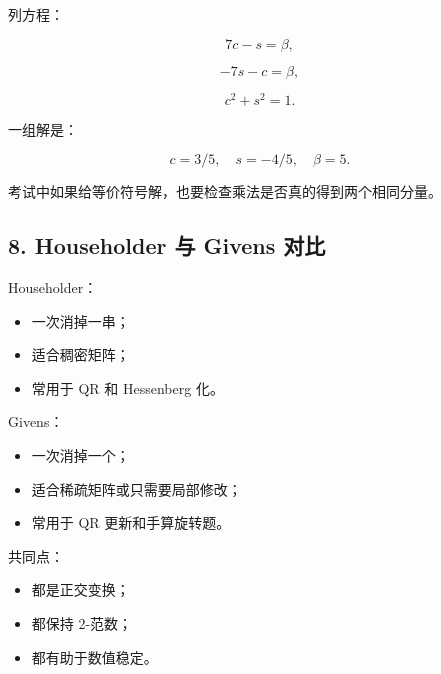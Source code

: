 \documentclass[11pt,a4paper]{ctexart}
\begin{document}
列方程：

\[
7c-s=\beta,
\]

\[
-7s-c=\beta,
\]

\[
c^2+s^2=1.
\]

一组解是：

\[
c=3/5,\quad s=-4/5,\quad \beta=5.
\]

考试中如果给等价符号解，也要检查乘法是否真的得到两个相同分量。


\subsection*{8. Householder 与 Givens 对比}


Householder：

\begin{itemize}

\item 一次消掉一串；

\item 适合稠密矩阵；

\item 常用于 QR 和 Hessenberg 化。

\end{itemize}

Givens：

\begin{itemize}

\item 一次消掉一个；

\item 适合稀疏矩阵或只需要局部修改；

\item 常用于 QR 更新和手算旋转题。

\end{itemize}

共同点：

\begin{itemize}

\item 都是正交变换；

\item 都保持 2-范数；

\item 都有助于数值稳定。

\end{itemize}

\end{document}
